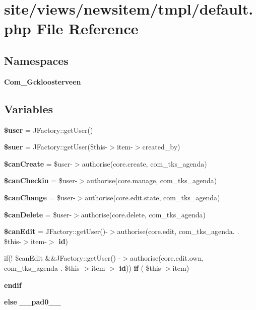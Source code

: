 \section{site/views/newsitem/tmpl/default.php File Reference}
\label{site_2views_2newsitem_2tmpl_2default_8php}
\subsection*{Namespaces}
\begin{DoxyCompactItemize}
\item 
 \textbf{ Com\+\_\+\+Gckloosterveen}
\end{DoxyCompactItemize}
\subsection*{Variables}
\begin{DoxyCompactItemize}
\item 
\textbf{ \$user} = J\+Factory\+::get\+User()
\item 
\textbf{ \$suer} = J\+Factory\+::get\+User(\$this-\/$>$item-\/$>$created\+\_\+by)
\item 
\textbf{ \$can\+Create} = \$user-\/$>$authorise(\textquotesingle{}core.\+create\textquotesingle{}, \textquotesingle{}com\+\_\+tks\+\_\+agenda\textquotesingle{})
\item 
\textbf{ \$can\+Checkin} = \$user-\/$>$authorise(\textquotesingle{}core.\+manage\textquotesingle{}, \textquotesingle{}com\+\_\+tks\+\_\+agenda\textquotesingle{})
\item 
\textbf{ \$can\+Change} = \$user-\/$>$authorise(\textquotesingle{}core.\+edit.\+state\textquotesingle{}, \textquotesingle{}com\+\_\+tks\+\_\+agenda\textquotesingle{})
\item 
\textbf{ \$can\+Delete} = \$user-\/$>$authorise(\textquotesingle{}core.\+delete\textquotesingle{}, \textquotesingle{}com\+\_\+tks\+\_\+agenda\textquotesingle{})
\item 
\textbf{ \$can\+Edit} = J\+Factory\+::get\+User()-\/$>$authorise(\textquotesingle{}core.\+edit\textquotesingle{}, \textquotesingle{}com\+\_\+tks\+\_\+agenda.\textquotesingle{} . \$this-\/$>$item-\/$>$\textbf{ id})
\item 
if(! \$can\+Edit \&\&J\+Factory\+::get\+User() -\/$>$authorise(\textquotesingle{}core.\+edit.\+own\textquotesingle{}, \textquotesingle{}com\+\_\+tks\+\_\+agenda\textquotesingle{} . \$this-\/$>$item-\/$>$\textbf{ id})) \textbf{ if} ( \$this-\/$>$item)
\item 
\textbf{ endif}
\item 
\textbf{ else} \textbf{ \+\_\+\+\_\+pad0\+\_\+\+\_\+}
\end{DoxyCompactItemize}


